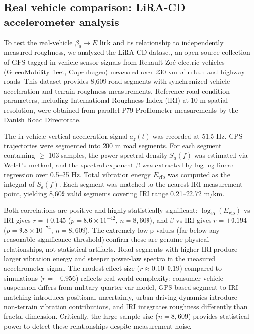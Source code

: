 \documentclass[11pt]{article}
\begin{document}
\subsection*{Real vehicle comparison: LiRA-CD accelerometer analysis}

To test the real-vehicle $\beta_a \rightarrow E$ link and its relationship to independently measured roughness, we analyzed the LiRA-CD dataset\cite{Skar2023}, an open-source collection of GPS-tagged in-vehicle sensor signals from Renault Zo\'{e} electric vehicles (GreenMobility fleet, Copenhagen) measured over 230 km of urban and highway roads. This dataset provides 8,609 road segments with synchronized vehicle acceleration and terrain roughness measurements. Reference road condition parameters, including International Roughness Index (IRI) at 10 m spatial resolution, were obtained from parallel P79 Profilometer measurements by the Danish Road Directorate.

The in-vehicle vertical acceleration signal $a_z(t)$ was recorded at 51.5 Hz. GPS trajectories were segmented into 200 m road segments. For each segment containing $\geq$ 103 samples, the power spectral density $S_a(f)$ was estimated via Welch's method, and the spectral exponent $\beta$ was extracted by log-log linear regression over 0.5--25 Hz. Total vibration energy $E_{\mathrm{vib}}$ was computed as the integral of $S_a(f)$. Each segment was matched to the nearest IRI measurement point, yielding 8,609 valid segments covering IRI range 0.21--22.72 m/km.

Both correlations are positive and highly statistically significant: $\log_{10}(E_{\mathrm{vib}})$ vs IRI gives $r = +0.145$ ($p = 8.6 \times 10^{-42}$, $n = 8{,}609$), and $\beta$ vs IRI gives $r = +0.194$ ($p = 9.8 \times 10^{-74}$, $n = 8{,}609$). The extremely low p-values (far below any reasonable significance threshold) confirm these are genuine physical relationships, not statistical artifacts. Road segments with higher IRI produce larger vibration energy and steeper power-law spectra in the measured accelerometer signal. The modest effect size ($r \approx 0.10$--$0.19$) compared to simulations ($r = -0.956$) reflects real-world complexity: consumer vehicle suspension differs from military quarter-car model, GPS-based segment-to-IRI matching introduces positional uncertainty, urban driving dynamics introduce non-terrain vibration contributions, and IRI integrates roughness differently than fractal dimension. Critically, the large sample size ($n = 8{,}609$) provides statistical power to detect these relationships despite measurement noise.
\end{document}
